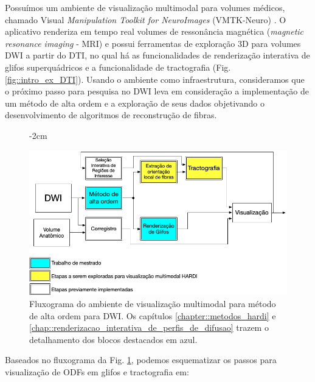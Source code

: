 \documentclass[
    12pt,                %
    oneside,            %
    a4paper,            %
    english,            %
    french,                %
    spanish,            %
    brazil                %
    ]{abntex2}
\begin{document}
Possuímos um ambiente de visualização multimodal para volumes médicos, chamado Visual \textit{Manipulation Toolkit for NeuroImages} (VMTK-Neuro) \cite{VMTKNeuro}. O aplicativo renderiza em tempo real volumes de ressonância magnética (\textit{magnetic resonance imaging} - MRI) e possui ferramentas de exploração 3D para volumes DWI a partir do DTI, no qual há as funcionalidades de renderização interativa de glifos superquádricos e a funcionalidade de tractografia (Fig. \ref{fig::intro_ex_DTI}). Usando o ambiente como infraestrutura, consideramos que o próximo passo para pesquisa no DWI leva em consideração a implementação de um método de alta ordem e a exploração de seus dados objetivando o desenvolvimento de algoritmos de reconstrução de fibras.

\begin{figure}[ht]
   \centering
       \addtolength{\leftskip} {-2cm} %
    \addtolength{\rightskip}{-2cm}

    \centering
    \includegraphics[width=.9\linewidth, angle=0]{figs/Introducao/fluxograma_VMTK_HARDI.png}
    \caption{Fluxograma do ambiente de visualização multimodal para método de alta ordem para DWI. Os capítulos \ref{chapter::metodos_hardi} e \ref{chap::renderizacao_interativa_de_perfis_de_difusao} trazem o detalhamento dos blocos destacados em azul.}
    \label{fig::flowchart_vmtk_hardi}
\end{figure}

Baseados no fluxograma da Fig. \ref{fig::flowchart_vmtk_hardi}, podemos esquematizar os passos para visualização de ODFs em glifos e tractografia em:
\end{document}
